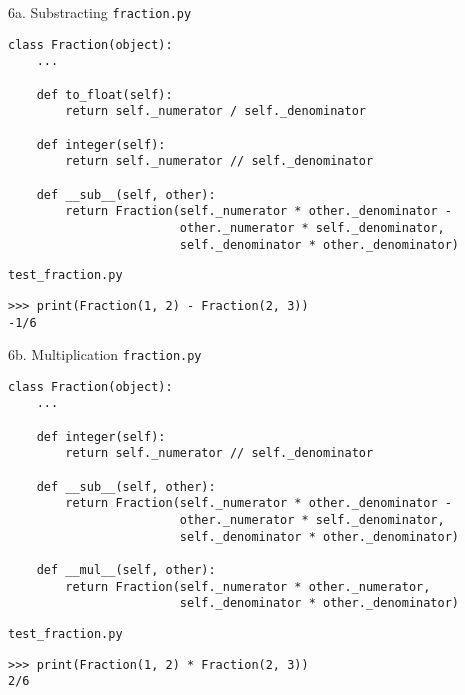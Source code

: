 \documentclass{beamer}
\begin{document}
\begin{frame}[fragile]{6a. Substracting}
\small
\texttt{fraction.py}
\begin{verbatim}
class Fraction(object):
    ...

    def to_float(self):
        return self._numerator / self._denominator

    def integer(self):
        return self._numerator // self._denominator

    def __sub__(self, other):
        return Fraction(self._numerator * other._denominator -
                        other._numerator * self._denominator,
                        self._denominator * other._denominator)
\end{verbatim}

\vfill

\texttt{test\_fraction.py}
\begin{verbatim}
>>> print(Fraction(1, 2) - Fraction(2, 3))
-1/6
\end{verbatim}
\end{frame}


\begin{frame}[fragile]{6b. Multiplication}
\small
\texttt{fraction.py}
\begin{verbatim}
class Fraction(object):
    ...

    def integer(self):
        return self._numerator // self._denominator

    def __sub__(self, other):
        return Fraction(self._numerator * other._denominator -
                        other._numerator * self._denominator,
                        self._denominator * other._denominator)

    def __mul__(self, other):
        return Fraction(self._numerator * other._numerator,
                        self._denominator * other._denominator)
\end{verbatim}

\vfill

\texttt{test\_fraction.py}
\begin{verbatim}
>>> print(Fraction(1, 2) * Fraction(2, 3))
2/6
\end{verbatim}
\end{frame}
\end{document}
